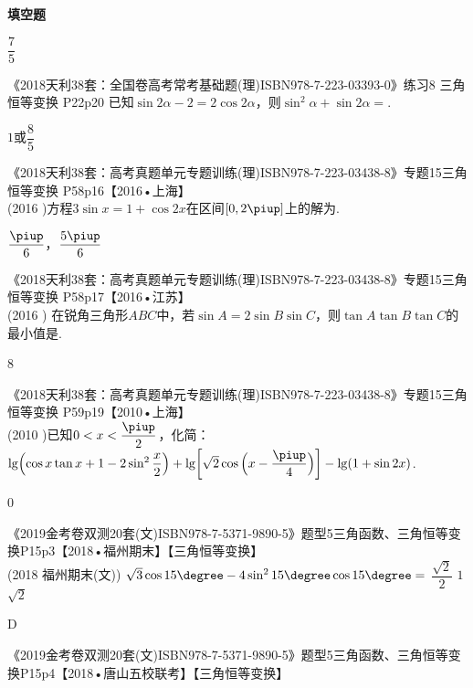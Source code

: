 \begin{exercise}{\bf 填空题}
\begin{answer}
        $\dfrac{7}5$
      \end{answer}
    \item 《2018天利38套：全国卷高考常考基础题(理)ISBN978-7-223-03393-0》练习8 三角恒等变换 P22p20
      已知$\sin{2\alpha}-2=2\cos{2\alpha}$，则$\sin^2\alpha+\sin{2\alpha}=$\tk.
      \begin{answer}
        $1$或$\dfrac{8}5$
      \end{answer}
    \item 《2018天利38套：高考真题单元专题训练(理)ISBN978-7-223-03438-8》专题15三角恒等变换 P58p16【2016•上海】\\
      (2016 )方程$3\sin x=1+\cos{2x}$在区间$[0,2\piup]$上的解为\tk.
      \begin{answer}
        $\dfrac{\piup}6$，$\dfrac{5\piup}6$
      \end{answer}
    \item 《2018天利38套：高考真题单元专题训练(理)ISBN978-7-223-03438-8》专题15三角恒等变换 P58p17【2016•江苏】\\
      (2016 )
      在锐角三角形$ABC$中，若$\sin{A}=2\sin{B}\sin{C}$，则$\tan{A}\tan{B}\tan{C}$的最小值是\tk.
      \begin{answer}
        8
      \end{answer}
    \item 《2018天利38套：高考真题单元专题训练(理)ISBN978-7-223-03438-8》专题15三角恒等变换 P59p19【2010•上海】\\
      (2010 )已知$0<x<\dfrac{\piup}2$，化简：\\
      $\lg\Bigl(\cos x\tan x+1-2\sin^2{\dfrac{x}2}\Bigr)+\lg\biggl[\sqrt{2}\cos {\Bigl(x-\dfrac{\piup}4\Bigr)}\biggr]-\lg(1+\sin{2x})$.
      \begin{answer}
        0
      \end{answer}
    \item 《2019金考卷双测20套(文)ISBN978-7-5371-9890-5》题型5三角函数、三角恒等变换P15p3【2018•福州期末】【三角恒等变换】\\
        {\kaishu (2018 \textbullet 福州期末(文))}
        $\sqrt3\cos15\degree-4\sin^215\degree\cos15\degree=$\xz
         {$\dfrac{\sqrt2}2$}
         {$1$}
         {$\sqrt2$}
        \begin{answer}
          D
        \end{answer}
    \item 《2019金考卷双测20套(文)ISBN978-7-5371-9890-5》题型5三角函数、三角恒等变换P15p4【2018•唐山五校联考】【三角恒等变换】\\

\end{exercise}
